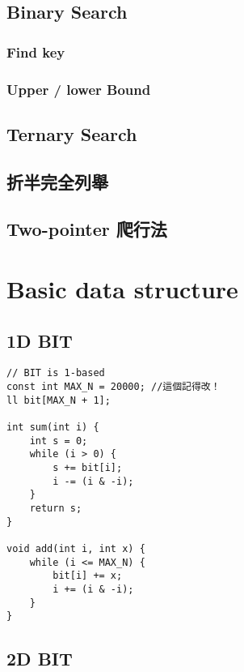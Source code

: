 \documentclass[10pt,oneside]{article}
\begin{document}
\begin{landscape}
\begin{multicols}{2}
\subsection{Binary Search}

\subsubsection{Find key}

\subsubsection{Upper / lower Bound}

\subsection{Ternary Search}

\subsection{折半完全列舉}

\subsection{Two-pointer 爬行法}


\section{Basic data structure}

\subsection{1D BIT}

\begin{lstlisting}
// BIT is 1-based
const int MAX_N = 20000; //這個記得改！
ll bit[MAX_N + 1];

int sum(int i) {
    int s = 0;
    while (i > 0) {
        s += bit[i];
        i -= (i & -i);
    }
    return s;
}

void add(int i, int x) {
    while (i <= MAX_N) {
        bit[i] += x;
        i += (i & -i);
    }
}
\end{lstlisting}

\subsection{2D BIT}


\end{multicols}
\end{landscape}
\end{document}
